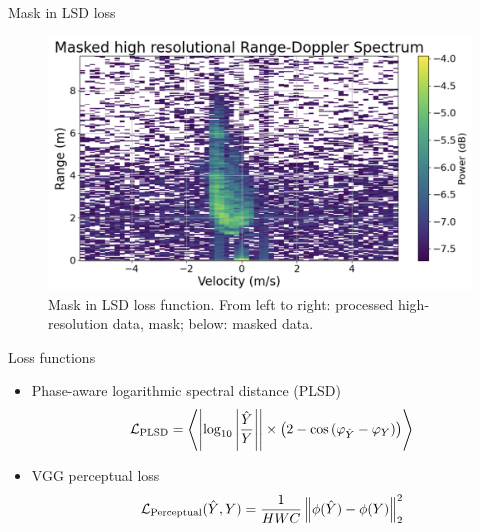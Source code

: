 \documentclass{beamer}
\begin{document}
\begin{frame}{Mask in LSD loss}
\begin{figure}
        \begin{minipage}{0.5\textwidth}
            \centering
            \includegraphics[width=\textwidth]{MA_presentation/figures/masked_gt.png}
        \end{minipage}

        \caption{Mask in LSD loss function. From left to right: processed high-resolution data, mask; below: masked data.}
    \end{figure}
\end{frame}




\begin{frame}[t]{Loss functions}

    \begin{itemize}
        \vspace{1.0\baselineskip}
        
        \item Phase-aware logarithmic spectral distance (PLSD) \cite{braun_consolidated_2020}
            \begin{equation}
                \centering
                \mathcal{L}_{\text{PLSD}} = \left\langle \left| \log_{10} \left| \frac{\hat{Y}}{Y} \right| \right| \times \left( 2 - \cos{(\varphi_{\hat{Y}} - \varphi_{Y})} \right) \right\rangle
            \end{equation}

        \vspace{1.8\baselineskip}
        
        \item VGG perceptual loss \cite{johnson_perceptual_2016}
            \begin{equation}
                \centering
                \mathcal{L}_{\text{Perceptual}} (\hat{Y}, Y) = \frac{1}{H W C} \left\| \phi (\hat{Y}) - \phi (Y) \right\|_2^2
            \end{equation}
    \end{itemize}
    
\end{frame}
\end{document}
